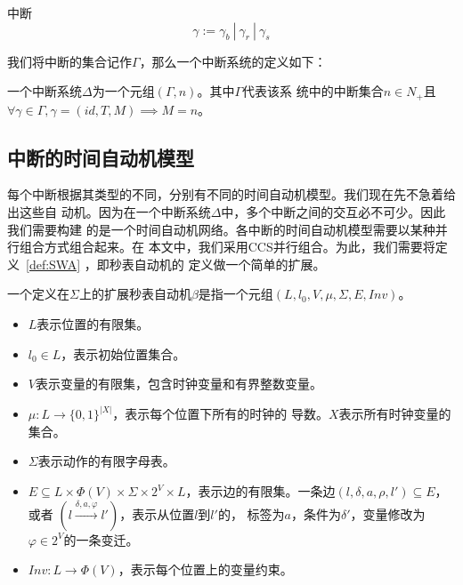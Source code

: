 \begin{definition}
	\label{def:intr}
	中断
	\begin{equation}
		\gamma := \gamma_b~|~\gamma_r~|~\gamma_s
	\end{equation}
\end{definition}

我们将中断的集合记作$\varGamma$，那么一个中断系统的定义如下：

\begin{definition}
	一个中断系统$\Delta$为一个元组$(\varGamma,n)$。其中$\varGamma$代表该系
	统中的中断集合$n\in N_+$且$\forall \gamma\in\varGamma, \gamma=(id, T, M)
	\implies M = n$。
\end{definition}

\subsection{中断的时间自动机模型}
\label{subsec:intr_automata}

每个中断根据其类型的不同，分别有不同的时间自动机模型。我们现在先不急着给出这些自
动机。因为在一个中断系统$\Delta$中，多个中断之间的交互必不可少。因此我们需要构建
的是一个时间自动机网络。各中断的时间自动机模型需要以某种并行组合方式组合起来。在
本文中，我们采用CCS并行组合。为此，我们需要将定义~\ref{def:SWA} ，即秒表自动机的
定义做一个简单的扩展。

\begin{definition}
	\label{def:SWA_ext}
	一个定义在$\varSigma$上的扩展秒表自动机$\beta$是指一个元组$(L,l_0,V,\mu,
	\varSigma,E,Inv)$。
	\begin{itemize}
		\item $L$表示位置的有限集。
		\item $l_0\in L$，表示初始位置集合。
		\item $V$表示变量的有限集，包含时钟变量和有界整数变量。
		\item $\mu:L\longrightarrow \{0,1\}^{|X|}$，表示每个位置下所有的时钟的
		导数。$X$表示所有时钟变量的集合。
		\item $\varSigma$表示动作的有限字母表。
		\item $E\subseteq L\times \varPhi(V)\times \varSigma \times 2^V
		\times L$，表示边的有限集。一条边$(l,\delta,a,\rho,l')\subseteq E$，或者
		$(l\stackrel{\delta,a,\varphi}{\longrightarrow}l')$，表示从位置$l$到$l'$的，
		标签为$a$，条件为$\delta'$，变量修改为$\varphi \in 2^V$的一条变迁。
		\item $Inv:L\longrightarrow \varPhi(V)$，表示每个位置上的变量约束。
	\end{itemize}
\end{definition}

